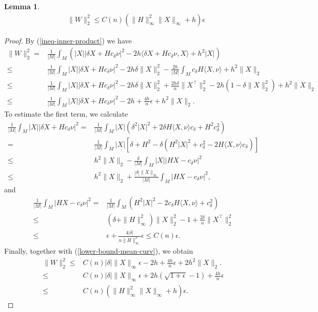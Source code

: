 \documentclass{amsart}
\numberwithin{equation}{section}
\newtheorem{lem}[theo]{Lemma}
\theoremstyle{remark}
\renewcommand{\(}{\left(}
\renewcommand{\)}{\right)}
\renewcommand{\~}{\tilde}
\renewcommand{\-}{\overline}
\renewcommand{\d}{\delta}
\newcommand{\e}{\epsilon}
\begin{document}
\begin{lem}
	\begin{align}
	&\|W\|_2^2 \leq C(n) \(\|H\|^2_\infty\|X\|_\infty+h\)\e \label{ineq-est-W}
	\end{align}
\end{lem}
\begin{proof}
	By (\ref{ineq-inner-product}) we have
	\begin{align*}
	\|W\|_2^2=&\frac{1}{|M|}\int_M  \(|X||\d X+H c_\d \nu|^2-2h\langle \d X+H c_\d\nu,X\rangle+h^2|X|\) \\
	\leq &\frac{1}{|M|}\int_M  |X||\d X+H c_\d \nu|^2 -2h\d \|X\|_2^2-\frac{2h}{|M|}\int_M  c_\d H\langle X,\nu\rangle +h^2\|X\|_2 \\
	\leq &\frac{1}{|M|}\int_M  |X||\d X+H c_\d \nu|^2 -2h\d \|X\|_2^2+\frac{2h\d}{n}\|X^\top\|_2^2-2h(1-\d\|X\|_2^2)+h^2\|X\|_2\\
	\leq & \frac{1}{|M|}\int_M  |X||\d X+H c_\d \nu|^2 -2h+\frac{4h}{n}\e+h^2\|X\|_2.
	\end{align*}
	To estimate the first term, we calculate
	\begin{align*}
	\frac{1}{|M|}\int_M  |X||\d X+H c_\d \nu|^2 =&\frac{1}{|M|}\int_M  |X|\(\d^2 |X|^2+2\d H\langle X,\nu\rangle  c_\d+H^2  c_\d^2\) \\
	= &\frac{1}{|M|}\int_M  |X|\left[ \d+H^2 -\d(H^2|X|^2+ c_\d^2-2 H\langle X,\nu\rangle  c_\d) \right] \\
	\leq &h^2 \|X\|_2-\frac{\d}{|M|}\int_M  |X| |HX- c_\d\nu|^2 \\
	\leq &h^2 \|X\|_2+\frac{|\d|\|X\|_\infty}{|M|}\int_M  |HX- c_\d\nu|^2,
	\end{align*}
	and
	\begin{align*}
	\frac{1}{|M|}\int_M  |HX- c_\d \nu|^2 = &\frac{1}{|M|}\int_M  \(H^2|X|^2-2 c_\d H\langle X,\nu\rangle+c_\d^2\)\\
	\leq & (\d+\|H\|_\infty^2)\|X\|_2^2-1+\frac{2\d}{n}\|X^\top\|_2^2\\
	\leq & \e+\frac{4|\d|}{n\|H\|_\infty^2}\e\leq C(n)\e.
	\end{align*}
	Finally, together with (\ref{lower-bound-mean-curv}), we obtain
	\begin{align*}
	\|W\|_2^2 \leq & C(n)|\d|  \|X\|_\infty\e-2h+\frac{4h}{n}\e+2h^2\|X\|_2. \\
	\leq &C(n)|\d| \|X\|_\infty\e+2h(\sqrt{1+\e}-1)+\frac{4h}{n}\e\\
	\leq &C(n) \(\|H\|^2_\infty\|X\|_\infty+h\)\e.
	\end{align*}
\end{proof}
\end{document}
